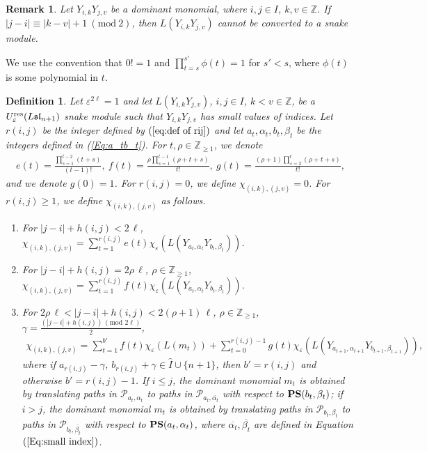 \documentclass[12pt, reqno]{amsart}
\newtheorem{definition}[theorem]{Definition}
\newtheorem{remark}[theorem]{Remark}
\numberwithin{equation}{section}
\newcommand{\ZZ}{\mathbb{Z}}
\newcommand{\res}{{\rm res}}
\begin{document}
{\begin{remark}\label{Re:non-snake module}
Let $Y_{i,k}Y_{j,v}$ be a dominant monomial, where $i,j \in I$, $k,v\in \ZZ$. If $|j-i|\equiv |k-v|+1\ (\text{mod}\ 2)$, then $L(Y_{i,k}Y_{j,v})$ cannot be converted to a snake module.
\end{remark}

We use the convention that $0!=1$ and $\prod_{t=s}^{s'} \phi(t) = 1$ for $s' < s$, where $\phi(t)$ is some polynomial in $t$.
\begin{definition}\label{Def: chi_(i,k,j,v)}
Let $\varepsilon^{2 \ell}=1$ and let $L(Y_{i,k}Y_{j,v})$, $i,j \in I$, $k<v\in \ZZ$, be a $U_{\varepsilon}^{\res}({L\mathfrak{sl}_{n+1}})$ snake module such that $Y_{i,k}Y_{j,v}$ has small values of indices. Let $r(i,j)$ be the integer defined by $(\ref{eq:def of rij})$ and let $a_t, \alpha_t, b_t, \beta_t$ be the integers defined in (\ref{Eq:a_tb_t}).
For $t, \rho \in \ZZ_{\ge 1}$, we denote
\begin{align*}
e(t) = \frac{\prod_{s=1}^{t-2} (t+s)}{(t-1)!}, \ f(t) = \frac{ \rho \prod_{s=1}^{t-1}(\rho+t+s)}{t!}, \ g(t) = \frac{ (\rho+1)\prod_{s=2}^t (\rho+t+s)}{t!},
\end{align*}
and we denote $g(0)=1$. For $r(i,j)=0$, we define $\chi_{(i,k),(j,v)}=0$. For $r(i,j) \ge 1$, we define $\chi_{(i,k),(j,v)}$ as follows.
\begin{enumerate}
\item For $|j-i|+h(i,j) < 2\,\ell$, $\chi_{(i,k),(j,v)}=\sum_{t=1}^{r(i,j)}e(t)\chi_\varepsilon(L(Y_{a_t, \alpha_t}Y_{b_t, \beta_t}))$.
\item For $|j-i|+h(i,j) =2\rho\,\ell$, $\rho\in\mathbb{Z}_{\geq 1}$, $\chi_{(i,k),(j,v)}=\sum_{t=1}^{r(i,j)} f(t)\chi_\varepsilon(L(Y_{a_t, \alpha_t}Y_{b_t, \beta_t}))$.
\item For $2\rho\,\ell<|j-i|+h(i,j) < 2(\rho+1)\,\ell$, $\rho\in\mathbb{Z}_{\geq1}$, $\gamma=\frac{(|j-i|+h(i,j))\,(\text{mod } 2 \ell)}2$,
\begin{align}\label{D:the sum 3}
\chi_{(i,k),(j,v)}= \sum_{t=1}^{b'}f(t)\chi_\varepsilon(L (m_{t}))+\sum_{t=0}^{r(i,j)-1}g(t)\chi_\varepsilon(L(Y_{a_{t+1}, \alpha_{t+1}}Y_{b_{t+1}, \beta_{t+1}})),
\end{align}
where if $a_{r(i,j)}-\gamma$, $b_{r(i,j)}+\gamma\in \hat{I}\cup\{n+1\}$, then $b'= r(i,j)$ and otherwise $b'= r(i,j)-1$.
If $i\leq j$, the dominant monomial $m_{t}$ is obtained by translating paths in $\mathscr{P}_{a_{t}, \alpha_{t}}$ to paths in $\mathscr{P}_{a_{t}, \overline{\alpha_t}}$ with respect to ${\bf PS}(b_t,\beta_t)$; if $i>j$, the dominant monomial $m_{t}$ is obtained by translating paths in $\mathscr{P}_{b_{t}, \beta_{t}}$ to paths in $\mathscr{P}_{b_{t}, \overline{\beta_t}}$ with respect to ${\bf PS}(a_t,\alpha_t)$, where $\overline{\alpha_t}, \overline{\beta_t}$ are defined in Equation $(\ref{Eq:small index})$.
\end{enumerate}
\end{definition}


}
\end{document}
